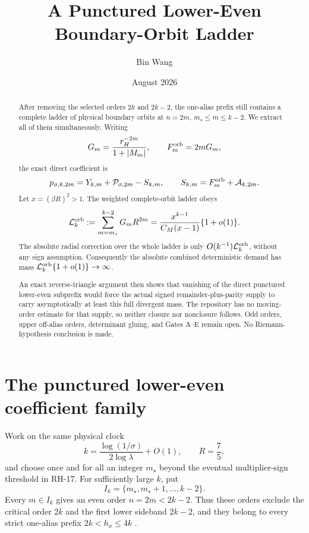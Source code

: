 \documentclass[11pt]{article}
\title{A Punctured Lower-Even Boundary-Orbit Ladder}
\author{Bin Wang}
\date{August 2026}
\theoremstyle{remark}
\newcommand{\cP}{\mathcal P}
\newcommand{\cA}{\mathcal A}
\newcommand{\cL}{\mathcal L}
\begin{document}
\maketitle

\begin{abstract}
After removing the selected orders $2k$ and $2k-2$, the one-alias prefix
still contains a complete ladder of physical boundary orbits at
$n=2m$, $m_\star\le m\le k-2$.  We extract all of them simultaneously.
Writing
\[
 G_m=\frac{r_H^{-2m}}{1+|M_m|},\qquad
 F_m^{\rm orb}=2mG_m,
\]
the exact direct coefficient is
\[
 p_{\sigma,k,2m}=Y_{k,m}+\cP_{\sigma,2m}-S_{k,m},
 \qquad
 S_{k,m}=F_m^{\rm orb}+\cA_{k,2m}.
\]
Let $x=(\beta R)^2>1$.  The weighted complete-orbit ladder obeys
\[
 \cL_k^{\rm orb}
 :=\sum_{m=m_\star}^{k-2}G_mR^{2m}
 =\frac{x^{k-1}}{C_M(x-1)}\{1+o(1)\}.
\]
The absolute radial correction over the whole ladder is only
$O(k^{-1})\cL_k^{\rm orb}$, without any sign assumption.  Consequently the
absolute combined deterministic demand has mass
$\cL_k^{\rm orb}\{1+o(1)\}\to\infty$.

An exact reverse-triangle argument then shows that vanishing of the direct
punctured lower-even subprefix would force the actual signed
remainder-plus-parity supply to carry asymptotically at least this full
divergent mass.  The repository has no moving-order estimate for that supply,
so neither closure nor nonclosure follows.  Odd orders, upper off-alias
orders, determinant gluing, and Gates A--E remain open.  No
Riemann-hypothesis conclusion is made.
\end{abstract}

\section{The punctured lower-even coefficient family}

Work on the same physical clock
\begin{equation}\label{eq:clock}
 k=\frac{\log(1/\sigma)}{2\log\lambda}+O(1),
 \qquad R=\frac75,
\end{equation}
and choose once and for all an integer $m_\star$ beyond the eventual
multiplier-sign threshold in RH-17.  For sufficiently large $k$, put
\begin{equation}\label{eq:index}
 I_k=\{m_\star,m_\star+1,\ldots,k-2\}.
\end{equation}
Every $m\in I_k$ gives an even order $n=2m<2k-2$.  Thus these orders exclude
the critical order $2k$ and the first lower sideband $2k-2$, and they belong
to every strict one-alias prefix $2k<h_\sigma\le4k$
\citep{WangSynchronizedPrefix2026,WangLowerBalance2026}.
\end{document}
